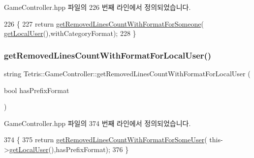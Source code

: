 Game\+Controller.\+hpp 파일의 226 번째 라인에서 정의되었습니다.


\begin{DoxyCode}
226                                                                       \{
227             \textcolor{keywordflow}{return} \hyperlink{class_tetris_1_1_game_controller_ac16414d257ffec350d6eaf47ce3ad490}{getRemovedLinesCountWithFormatForSomeone}(
      \hyperlink{class_tetris_1_1_game_controller_abc67d4b309ce2886b43a3b4e0af22abc}{getLocalUser}(),withCategoryFormat);
228         \}
\end{DoxyCode}
\mbox{\label{class_tetris_1_1_game_controller_a9fdc5288a92d09283a6250d684d69876}} 
\subsubsection{\texorpdfstring{get\+Removed\+Lines\+Count\+With\+Format\+For\+Local\+User()}{getRemovedLinesCountWithFormatForLocalUser()}}
{\footnotesize\ttfamily string Tetris\+::\+Game\+Controller\+::get\+Removed\+Lines\+Count\+With\+Format\+For\+Local\+User (\begin{DoxyParamCaption}\item[{bool}]{has\+Prefix\+Format }\end{DoxyParamCaption})\hspace{0.3cm}{\ttfamily [inline]}}



Game\+Controller.\+hpp 파일의 374 번째 라인에서 정의되었습니다.


\begin{DoxyCode}
374                                                                                \{
375             \textcolor{keywordflow}{return} \hyperlink{class_tetris_1_1_game_controller_a2e7275bdb8f29ce4f1dfec790c22705d}{getRemovedLinesCountWithFormatForSomeUser}(
      this->\hyperlink{class_tetris_1_1_game_controller_abc67d4b309ce2886b43a3b4e0af22abc}{getLocalUser}(),hasPrefixFormat);
376         \}
\end{DoxyCode}
\mbox{\label{class_tetris_1_1_game_controller_ac16414d257ffec350d6eaf47ce3ad490}} 
